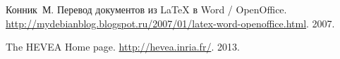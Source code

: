 \documentclass[10pt, a5paper]{article}
\begin{document}
% 
% 


\begin{thebibliography}{9}
{Конник~М.} Перевод документов из LaTeX в Word / OpenOffice.
  \url{http://mydebianblog.blogspot.ru/2007/01/latex-word-openoffice.html}.
 2007.

The HEVEA Home page.
 \url{http://hevea.inria.fr/}.
 2013.

\end{thebibliography}
\end{document}
